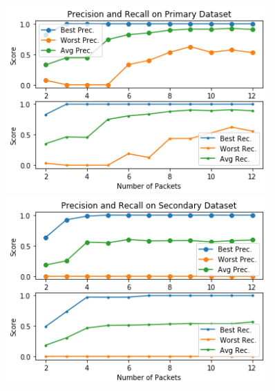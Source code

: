 \documentclass[msc,deptreport, cs]{infthesis} %
\begin{document}
\vspace{-7mm}
\begin{figure}[H]
    \centering
    \begin{minipage}{0.5\textwidth}
        \centering
        \includegraphics[width=0.9\textwidth]{primary_prec.png} %
        \caption{}
        \label{fig:primary}
    \end{minipage}\hfill
    \begin{minipage}{0.5\textwidth}
        \centering
        \includegraphics[width=0.9\textwidth]{secondary_prec.png} %
        \caption{}
        \label{fig:secondary}
    \end{minipage}
\end{figure}
\end{document}

